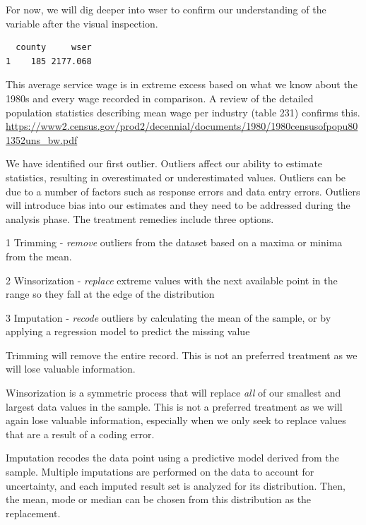 \documentclass[]{article}
\newenvironment{Shaded}{}{}
\newcommand{\DecValTok}[1]{#1}
\newcommand{\KeywordTok}[1]{\textcolor[rgb]{0.00,0.00,1.00}{#1}}
\newcommand{\NormalTok}[1]{#1}
\newcommand{\OperatorTok}[1]{#1}
\newcommand{\StringTok}[1]{\textcolor[rgb]{0.00,0.50,0.50}{#1}}
\begin{document}
For now, we will dig deeper into wser to confirm our understanding of
the variable after the visual inspection.

\begin{Shaded}
\end{Shaded}

\begin{verbatim}
  county     wser
1    185 2177.068
\end{verbatim}

This average service wage is in extreme excess based on what we know
about the 1980s and every wage recorded in comparison. A review of the
detailed population statistics describing mean wage per industry (table
231) confirms this.
\url{https://www2.census.gov/prod2/decennial/documents/1980/1980censusofpopu801352uns_bw.pdf}

We have identified our first outlier. Outliers affect our ability to
estimate statistics, resulting in overestimated or underestimated
values. Outliers can be due to a number of factors such as response
errors and data entry errors. Outliers will introduce bias into our
estimates and they need to be addressed during the analysis phase. The
treatment remedies include three options.

1 Trimming - \emph{remove} outliers from the dataset based on a maxima
or minima from the mean.

2 Winsorization - \emph{replace} extreme values with the next available
point in the range so they fall at the edge of the distribution

3 Imputation - \emph{recode} outliers by calculating the mean of the
sample, or by applying a regression model to predict the missing value

Trimming will remove the entire record. This is not an preferred
treatment as we will lose valuable information.

Winsorization is a symmetric process that will replace \emph{all} of our
smallest and largest data values in the sample. This is not a preferred
treatment as we will again lose valuable information, especially when we
only seek to replace values that are a result of a coding error.

Imputation recodes the data point using a predictive model derived from
the sample. Multiple imputations are performed on the data to account
for uncertainty, and each imputed result set is analyzed for its
distribution. Then, the mean, mode or median can be chosen from this
distribution as the replacement.
\end{document}
